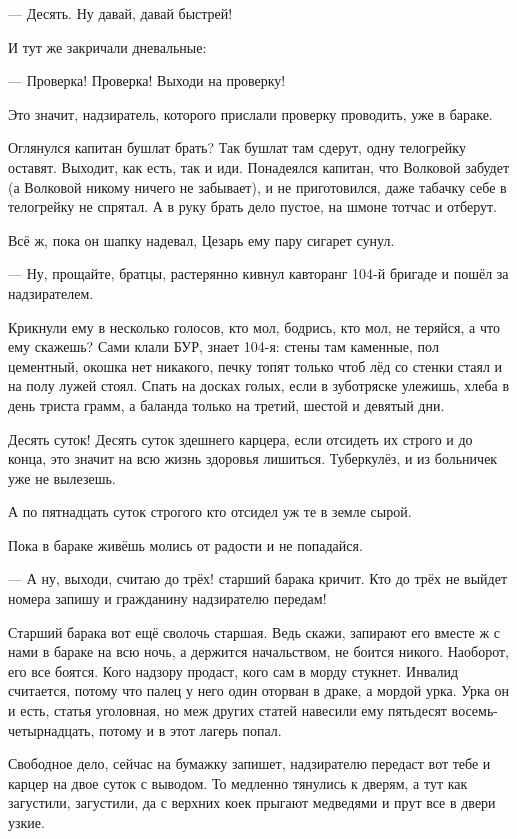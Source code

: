 --- Десять. Ну давай, давай быстрей!

И тут же закричали дневальные:

--- Проверка! Проверка! Выходи на проверку!

Это значит, надзиратель, которого прислали проверку проводить, уже в бараке.

Оглянулся капитан \dash бушлат брать? Так бушлат там сдерут, одну телогрейку оставят. Выходит,
как есть, так и иди. Понадеялся капитан, что Волковой забудет (а Волковой никому ничего не
забывает), и не приготовился, даже табачку себе в телогрейку не спрятал. А в руку брать \dash дело
пустое, на шмоне тотчас и отберут.

Всё ж, пока он шапку надевал, Цезарь ему пару сигарет сунул.

--- Ну, прощайте, братцы, \dash растерянно кивнул кавторанг 104-й бригаде и пошёл за надзирателем.

Крикнули ему в несколько голосов, кто \dash мол, бодрись, кто \dash мол, не теряйся, \dash а что ему
скажешь? Сами клали БУР, знает 104-я: стены там каменные, пол цементный, окошка нет никакого,
печку топят \dash только чтоб лёд со стенки стаял и на полу лужей стоял. Спать \dash на досках голых,
если в зуботряске улежишь, хлеба в день \dash триста грамм, а баланда \dash только на третий, шестой
и девятый дни.

Десять суток! Десять суток здешнего карцера, если отсидеть их строго и до конца, \dash это значит
на всю жизнь здоровья лишиться. Туберкулёз, и из больничек уже не вылезешь.

А по пятнадцать суток строгого кто отсидел \dash уж те в земле сырой.

Пока в бараке живёшь \dash молись от радости и не попадайся.

--- А ну, выходи, считаю до трёх! \dash старший барака кричит. \Dash Кто до трёх не выйдет \dash номера
запишу и гражданину надзирателю передам!

Старший барака \dash вот ещё сволочь старшая. Ведь скажи, запирают его вместе ж с нами в бараке
на всю ночь, а держится начальством, не боится никого. Наоборот, его все боятся. Кого надзору
продаст, кого сам в морду стукнет. Инвалид считается, потому что палец у него один оторван в
драке, а мордой \dash урка. Урка он и есть, статья уголовная, но меж других статей навесили ему
пятьдесят восемь-четырнадцать, потому и в этот лагерь попал.

Свободное дело, сейчас на бумажку запишет, надзирателю передаст \dash вот тебе и карцер на двое
суток с выводом. То медленно тянулись к дверям, а тут как загустили, загустили, да с верхних
коек прыгают медведями и прут все в двери узкие.

